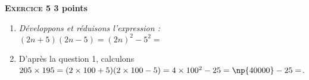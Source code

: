 \textbf{\textsc{Exercice 5} \hfill 3 points}

\medskip
 
\begin{enumerate}
\item \textit{Développons et réduisons l'expression :} $(2n + 5)(2n - 5)=(2n)^2-5^2=$ %
\item D'après la question 1, calculons $205 \times 195=(2\times 100+5)(2\times 100-5)=4\times 100^2-25= \np{40000} - 25= $. 
\end{enumerate}

\vspace{0,5cm}

